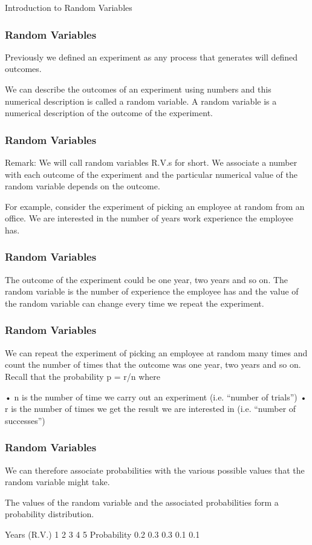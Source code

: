 \documentclass[IntroMain.tex]{subfiles}
\begin{document}
	
	Introduction to Random Variables
\begin{frame}
	\frametitle{Random Variables}	
	Previously we defined an experiment as any process that generates will defined outcomes.
	
	We can describe the outcomes of an experiment using numbers and this numerical description is called a random variable.
	A random variable is a numerical description of the outcome of the experiment.
\end{frame}
	
\begin{frame}
	\frametitle{Random Variables}	
	Remark: We will call random variables R.V.s for short.
	We associate a number with each outcome of the experiment and the particular numerical value of the random variable depends on the outcome.
	
	For example, consider the experiment of picking an employee at random from an office. We are interested in the number of years work experience the employee has.
\end{frame}

\begin{frame}
	\frametitle{Random Variables}	
	The outcome of the experiment could be one year, two years and so on. The random variable is the number of experience the employee has and the value of the random variable can change every time we repeat the experiment.
	
\end{frame}

\begin{frame}
	\frametitle{Random Variables}	
	We can repeat the experiment of picking an employee at random many times and count the number of times that the outcome was one year, two years and so on.
	Recall that the probability p = r/n where
	
	•	n is the number of time we carry out an experiment (i.e.    “number of trials”) 
	•	r is the number of times we get the result we are interested in (i.e. “number of successes”)
	
\end{frame}

\begin{frame}
	\frametitle{Random Variables}	
	We can therefore associate probabilities with the various possible values that the random variable might take.
	
	The values of the random variable and the associated probabilities form a probability distribution.
	
	Years (R.V.)   	1	2	3	4	5
	Probability	0.2	0.3	0.3	0.1	0.1
\end{frame}
\end{document}
